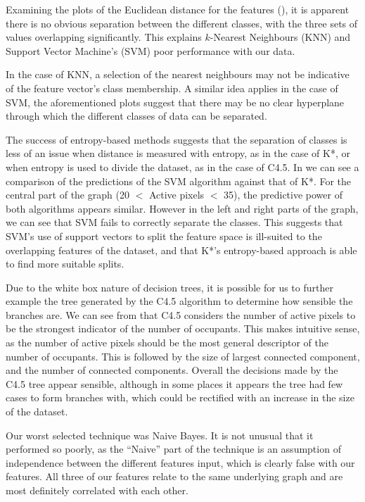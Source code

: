 \documentclass[../thesis/thesis.tex]{subfiles}
\begin{document}
Examining the plots of the Euclidean distance for the features (), it is apparent there is no obvious separation between the different classes, with the three sets of values overlapping significantly. This explains $k$-Nearest Neighbours (KNN) and Support Vector Machine's (SVM) poor performance with our data.

In the case of KNN, a selection of the nearest neighbours may not be indicative of the feature vector's class membership. A similar idea applies in the case of SVM, the aforementioned plots suggest that there may be no clear hyperplane through which the different classes of data can be separated.

The success of entropy-based methods suggests that the separation of classes is less of an issue when distance is measured with entropy, as in the case of K*, or when entropy is used to divide the dataset, as in the case of C4.5. In  we can see a comparison of the predictions of the SVM algorithm against that of K*. For the central part of the graph (20 $<$ Active pixels $<$ 35), the predictive power of both algorithms appears similar. However in the left and right parts of the graph, we can see that SVM fails to correctly separate the classes. This suggests that SVM's use of support vectors to split the feature space is ill-suited to the overlapping features of the dataset, and that K*'s entropy-based approach is able to find more suitable splits.

Due to the white box nature of decision trees, it is possible for us to further example the tree generated by the C4.5 algorithm  to determine how sensible the branches are. We can see from  that C4.5 considers the number of active pixels to be the strongest indicator of the number of occupants. This makes intuitive sense, as the number of active pixels should be the most general descriptor of the number of occupants. This is followed by the size of largest connected component, and the number of connected components. Overall the decisions made by the C4.5 tree appear sensible, although in some places it appears the tree had few cases to form branches with, which could be rectified with an increase in the size of the dataset.

Our worst selected technique was Naive Bayes. It is not unusual that it performed so poorly, as the ``Naive'' part of the technique is an assumption of independence between the different features input, which is clearly false with our features. All three of our features relate to the same underlying graph and are most definitely correlated with each other.
\end{document}

